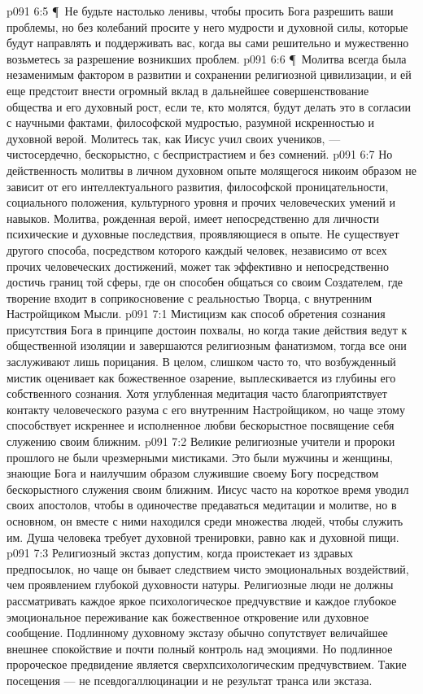 \vs p091 6:5 \P\ Не будьте настолько ленивы, чтобы просить Бога разрешить ваши проблемы, но без колебаний просите у него мудрости и духовной силы, которые будут направлять и поддерживать вас, когда вы сами решительно и мужественно возьметесь за разрешение возникших проблем.
\vs p091 6:6 \P\ Молитва всегда была незаменимым фактором в развитии и сохранении религиозной цивилизации, и ей еще предстоит внести огромный вклад в дальнейшее совершенствование общества и его духовный рост, если те, кто молятся, будут делать это в согласии с научными фактами, философской мудростью, разумной искренностью и духовной верой. Молитесь так, как Иисус учил своих учеников, --- чистосердечно, бескорыстно, с беспристрастием и без сомнений.
\vs p091 6:7 Но действенность молитвы в личном духовном опыте молящегося никоим образом не зависит от его интеллектуального развития, философской проницательности, социального положения, культурного уровня и прочих человеческих умений и навыков. Молитва, рожденная верой, имеет непосредственно для личности психические и духовные последствия, проявляющиеся в опыте. Не существует другого способа, посредством которого каждый человек, независимо от всех прочих человеческих достижений, может так эффективно и непосредственно достичь границ той сферы, где он способен общаться со своим Создателем, где творение входит в соприкосновение с реальностью Творца, с внутренним Настройщиком Мысли.
\vs p091 7:1 Мистицизм как способ обретения сознания присутствия Бога в принципе достоин похвалы, но когда такие действия ведут к общественной изоляции и завершаются религиозным фанатизмом, тогда все они заслуживают лишь порицания. В целом, слишком часто то, что возбужденный мистик оценивает как божественное озарение, выплескивается из глубины его собственного сознания. Хотя углубленная медитация часто благоприятствует контакту человеческого разума с его внутренним Настройщиком, но чаще этому способствует искреннее и исполненное любви бескорыстное посвящение себя служению своим ближним.
\vs p091 7:2 Великие религиозные учители и пророки прошлого не были чрезмерными мистиками. Это были мужчины и женщины, знающие Бога и наилучшим образом служившие своему Богу посредством бескорыстного служения своим ближним. Иисус часто на короткое время уводил своих апостолов, чтобы в одиночестве предаваться медитации и молитве, но в основном, он вместе с ними находился среди множества людей, чтобы служить им. Душа человека требует духовной тренировки, равно как и духовной пищи.
\vs p091 7:3 Религиозный экстаз допустим, когда проистекает из здравых предпосылок, но чаще он бывает следствием чисто эмоциональных воздействий, чем проявлением глубокой духовности натуры. Религиозные люди не должны рассматривать каждое яркое психологическое предчувствие и каждое глубокое эмоциональное переживание как божественное откровение или духовное сообщение. Подлинному духовному экстазу обычно сопутствует величайшее внешнее спокойствие и почти полный контроль над эмоциями. Но подлинное пророческое предвидение является сверхпсихологическим предчувствием. Такие посещения --- не псевдогаллюцинации и не результат транса или экстаза.
